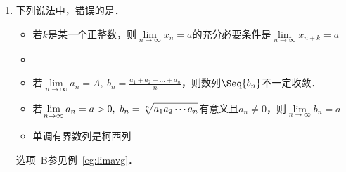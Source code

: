 \begin{enumerate}
    对选项~D的证明：
    \begin{proof}
      存在正整数\(N_1\)使得当\(n \ge N_1\)时都有
      \begin{gather*}
        \abs[\bigg]{\,\frac{a_{n+1}}{a_n}\,} < \frac{1+q}{2} = q + \frac{1-q}{2}, \\
        \shortintertext{从而当\(n > N\)时有}
        0 < \abs[\big]{\,a_n} < \abs[\big]{\,a_{N_1}} \, \paren[\bigg]{\frac{1+q}{2}}^{n-N_1}.
      \end{gather*}
      易知\(\lim\limits_{n\to\infty} \abs[\big]{\,a_{N_1}} \, \paren[\Big]{\frac{1+q}{2}}^{n-N_1} = 0\)，所以由夹逼定理可知\(\lim_{n\to\infty} \abs*{\,a_n\,} = 0\)，从而
      \begin{equation*}
        \lim_{n\to\infty} a_n = 0.
        \qedhere
      \end{equation*}
    \end{proof}
  \fi

\item 下列说法中，错误的是\uline{\makebox[10em]{}}．
  \begin{itemize}
    \renewcommand{\labelitemi}{\faCircleThin}
    \addtolength{\itemsep}{.67ex}
  \item 若\(k\)是某一个正整数，则\(\lim\limits_{n\to\infty} x_n = a\)的充分必要条件是\(\lim\limits_{n\to\infty} x_{n+k} = a\)
    \ifshowsol
    \item[\faCircle]
    \else
    \item
    \fi
    若\(\lim\limits_{n\to\infty} a_n = A,\ b_n = \frac{a_1 + a_2 + \dots + a_n}{n}\)，则数列\(\Seq{b_n}\)不一定收敛．
  \item 若\(\lim\limits_{n\to\infty} a_n = a > 0,\ b_n = \sqrt[n]{a_1 a_2 \dotsm a_n \mathstrut}\)有意义且\(a_n \ne 0\)，则\(\lim\limits_{n\to\infty} b_n = a\)
  \item 单调有界数列是柯西列
  \end{itemize}

  \ifshowsol
    选项~B参见例~\ref{eg:limavg}．


\end{enumerate}
